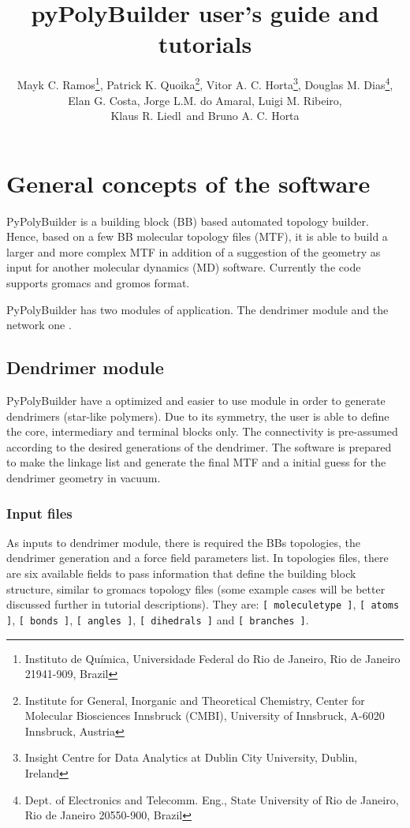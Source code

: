 \documentclass[12pt]{article}
\title{pyPolyBuilder user's guide and tutorials}
\author{
	Mayk C. Ramos\thanks{Instituto de Qu\'imica, Universidade Federal do Rio de Janeiro, Rio de Janeiro 21941-909, Brazil},
	Patrick K. Quoika\thanks{Institute for General, Inorganic and Theoretical Chemistry, Center for Molecular Biosciences Innsbruck (CMBI), University of Innsbruck, A-6020 Innsbruck, Austria}, 
	Vitor A. C. Horta\thanks{Insight Centre for Data Analytics at Dublin City University, Dublin, Ireland},
	Douglas M. Dias\thanks{Dept. of Electronics and Telecomm. Eng., State University of Rio de Janeiro, Rio de Janeiro 20550-900, Brazil},\\
	Elan G. Costa\samethanks{},
	Jorge L.M. do Amaral\samethanks{},
	Luigi M. Ribeiro\samethanks{},\\
	Klaus R. Liedl\samethanks[2]\  and 
	Bruno A. C. Horta\samethanks[1]
}
\begin{document}
\maketitle

\begin{abstract}
\end{abstract}

\tableofcontents

\renewcommand{\baselinestretch}{1.5}
\normalsize

\section{General concepts of the software}

PyPolyBuilder is a building block (BB) based automated topology builder.
Hence, based on a few BB molecular topology files (MTF), it is able to build a larger and more complex MTF in addition of a suggestion of the geometry as input for another molecular dynamics (MD) software.
Currently the code supports gromacs and gromos format.

PyPolyBuilder has two modules of application. The dendrimer module and the network one .

\subsection{Dendrimer module}
PyPolyBuilder have a optimized and easier to use module in order to generate dendrimers (star-like polymers).
Due to its symmetry, the user is able to define the core, intermediary and terminal blocks only.
The connectivity is pre-assumed according to the desired generations of the dendrimer.
The software is prepared to make the linkage list and generate the final MTF and a initial guess for the dendrimer geometry in vacuum.

\subsubsection{Input files}
\label{sec:DENDinputFiles}
As inputs to dendrimer module, there is required the BBs topologies, the dendrimer generation and a force field parameters list.
In topologies files, there are six available fields to pass information that define the building block structure, similar to gromacs topology files (some example cases will be better discussed further in tutorial descriptions).
They are: \texttt{[ moleculetype ]}, \texttt{[ atoms ]}, \texttt{[ bonds ]}, \texttt{[ angles ]}, \texttt{[ dihedrals ]} and \texttt{[ branches ]}.
\end{document}
